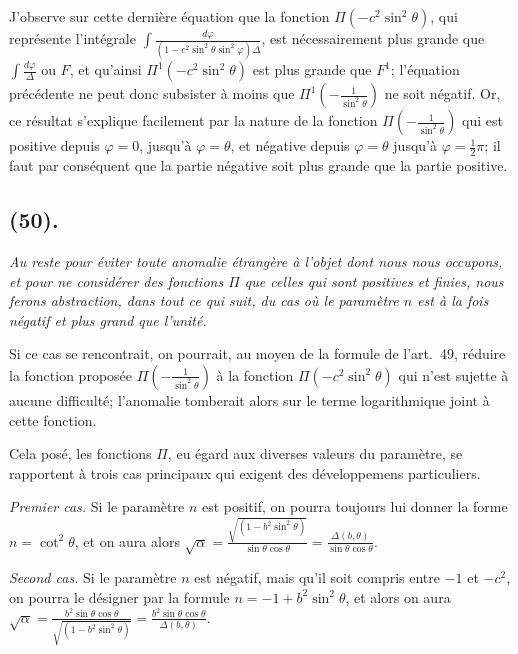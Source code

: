 \documentclass{article}
\begin{document}
J'observe sur cette dernière équation que la fonction $\Pi(-c^{2}\sin^{2}\theta)$, qui représente l'intégrale $\displaystyle\int\frac{d\varphi}{(1-c^{2}\sin^{2}\theta\sin^{2}\varphi)\Delta}$, est nécessairement plus grande que $\displaystyle\int\frac{d\varphi}{\Delta}$ ou $F$, et qu'ainsi $\Pi^{1}(-c^{2}\sin^{2}\theta)$ est plus grande que $F^{1}$; l'équation précédente ne peut donc subsister à moins que $\Pi^{1}\left(-\frac{1}{\sin^{2}\theta}\right)$ ne soit négatif. Or, ce résultat s'explique facilement par la nature de la fonction $\Pi\left(-\frac{1}{\sin^{2}\theta}\right)$ qui est positive depuis $\varphi=0$, jusqu'à $\varphi=\theta$, et négative depuis $\varphi=\theta$ jusqu'à $\varphi=\frac{1}{2}\pi$; il faut par conséquent que la partie négative soit plus grande que la partie positive.

\subsection*{(50).}

\emph{Au reste pour éviter toute anomalie étrangère à l'objet dont nous nous occupons, et pour ne considérer des fonctions $\Pi$ que celles qui sont positives et finies, nous ferons abstraction, dans tout ce qui suit, du cas où le paramètre $n$ est à la fois négatif et plus grand que l'unité.}

Si ce cas se rencontrait, on pourrait, au moyen de la formule de l'art.\ 49, réduire la fonction proposée $\Pi\left(-\frac{1}{\sin^{2}\theta}\right)$ à la fonction $\Pi(-c^{2}\sin^{2}\theta)$ qui n'est sujette à aucune difficulté; l'anomalie tomberait alors sur le terme logarithmique joint à cette fonction.

Cela posé, les fonctions $\Pi$, eu égard aux diverses valeurs du paramètre, se rapportent à trois cas principaux qui exigent des développemens particuliers.

\emph{Premier cas.} Si le paramètre $n$ est positif, on pourra toujours lui donner la forme $n=\cot^{2}\theta$, et on aura alors $\sqrt{\alpha}=\frac{\sqrt{(1-b^{2}\sin^{2}\theta)}}{\sin\theta\cos\theta}=\frac{\Delta(b,\theta)}{\sin\theta\cos\theta}$.

\emph{Second cas.} Si le paramètre $n$ est négatif, mais qu'il soit compris entre $-1$ et $-c^{2}$, on pourra le désigner par la formule $n=-1+b^{2}\sin^{2}\theta$, et alors on aura $\sqrt{\alpha}=\frac{b^{2}\sin\theta\cos\theta}{\sqrt{(1-b^{2}\sin^{2}\theta)}}=\frac{b^{2}\sin\theta\cos\theta}{\Delta(b,\theta)}$.

\end{document}
